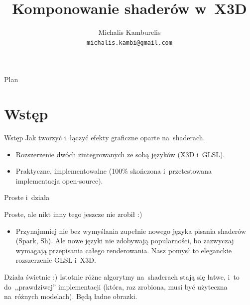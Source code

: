 \documentclass{beamer}
\title{Komponowanie shaderów w~X3D}
\author[Michalis Kamburelis]{Michalis Kamburelis \\ \texttt{michalis.kambi@gmail.com}}
\begin{document}
{
  \begin{frame}
    \titlepage
  \end{frame}
}

\begin{frame}{Plan}
  \tableofcontents
\end{frame}

\section{Wstęp}

\begin{frame}{Wstęp}
Jak tworzyć i~łączyć efekty graficzne oparte na~shaderach.

\begin{itemize}
  \item Rozszerzenie dwóch zintegrowanych ze sobą języków (X3D i~GLSL).
  \item Praktyczne, implementowalne (100\% skończona
    i~przetestowana implementacja open-source).
\end{itemize}
\end{frame}

\begin{frame}{Proste i~działa}

Proste, ale nikt inny tego jeszcze nie zrobił :)

\begin{itemize}
  \item Przynajmniej nie bez wymyślania zupełnie nowego języka pisania shaderów
    (Spark, Sh). Ale nowe języki nie zdobywają popularności,
    bo zazwyczaj wymagają przepisania całego renderowania.
    Nasz pomysł to eleganckie rozszerzenie GLSL i~X3D.
\end{itemize}

Działa świetnie :) Istotnie różne algorytmy na~shaderach stają się łatwe,
i~to do~,,prawdziwej'' implementacji (która, raz zrobiona,
musi być użyteczna na~różnych modelach).
Będą ładne obrazki.


\end{frame}
\end{document}
